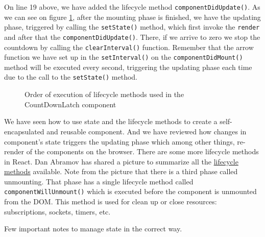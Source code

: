 \documentclass[a4paper, oneside, titlepage, 12pt]{book}
\begin{document}
On line 19 above, we have added the lifecycle method \texttt{componentDidUpdate()}. As we can see on figure \ref{fig:lifecy}, after the mounting phase is finished, we have the updating phase, triggered by calling the \texttt{setState()} method, which first invoke the \texttt{render} and after that the \texttt{componentDidUpdate()}. There, if we arrive to zero we stop the countdown by calling the \texttt{clearInterval()} function. Remember that the arrow function we have set up in the \texttt{setInterval()} on the \texttt{componentDidMount()} method will be executed every second, triggering the updating phase each time due to the call to the \texttt{setState()} method.

\begin{figure}[htbp]
  \centering
  
  \caption{Order of execution of lifecycle methods used in the CountDownLatch component}
   \label{fig:lifecy}
\end{figure}

We have seen how to use state and the lifecycle methods to create a self-encapsulated and reusable component. And we have reviewed how changes in component's state triggers the updating phase which among other things, re-render of the components on the browser. There are some more lifecycle methods in React. Dan Abramov has shared a picture to summarize all the \href{https://twitter.com/dan_abramov/status/981712092611989509/photo/1}{lifecycle methods} available. Note from the picture that there is a third phase called unmounting. That phase has a single  lifecycle method called \texttt{componentWillUnmount()} which is executed before the component is unmounted from the DOM. This method is used for clean up or close resources: subscriptions, sockets, timers, etc.
\newline

Few important notes to manage state in the correct way.
\end{document}
